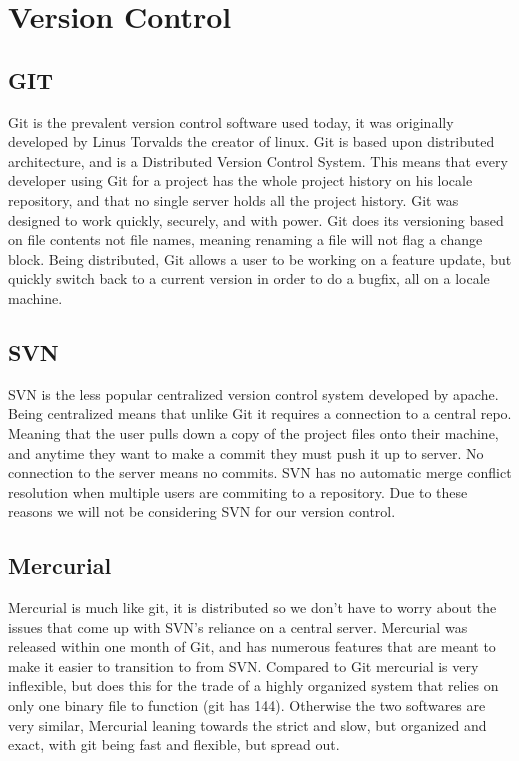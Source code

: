 \documentclass[onecolumn, draftclsnofoot,10pt, compsoc]{IEEEtran}
\begin{document}
\section{Version Control}
\subsection{GIT}
    Git is the prevalent version control software used today, it was originally developed by Linus Torvalds the creator of linux. Git is based upon distributed architecture, and is a Distributed Version Control System. This means that every developer using Git for a project has the whole project history on his locale repository, and that no single server holds all the project history. Git was designed to work quickly, securely, and with power. Git does its versioning based on file contents not file names, meaning renaming a file will not flag a change block. Being distributed, Git allows a user to be working on a feature update, but quickly switch back to a current version in order to do a bugfix, all on a locale machine.
\subsection{SVN}
    SVN is the less popular centralized version control system developed by apache. Being centralized means that unlike Git it requires a connection to a central repo. Meaning that the user pulls down a copy of the project files onto their machine, and anytime they want to make a commit they must push it up to server. No connection to the server means no commits. SVN has no automatic merge conflict resolution when multiple users are commiting to a repository. Due to these reasons we will not be considering SVN for our version control.
\subsection{Mercurial}
    Mercurial is much like git, it is distributed so we don't have to worry about the issues that come up with SVN's reliance on a central server. Mercurial was released within one month of Git, and has numerous features that are meant to make it easier to transition to from SVN. Compared to Git mercurial is very inflexible, but does this for the trade of a highly organized system that relies on only one binary file to function (git has 144). Otherwise the two softwares are very similar, Mercurial leaning towards the strict and slow, but organized and exact, with git being fast and flexible, but spread out.
\newpage
\end{document}
